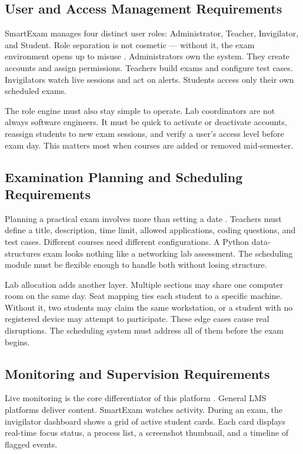 \subsection{User and Access Management Requirements}

SmartExam manages four distinct user roles: Administrator, Teacher, Invigilator, and Student. Role separation is not cosmetic — without it, the exam environment opens up to misuse \cite{rbac1}. Administrators own the system. They create accounts and assign permissions. Teachers build exams and configure test cases. Invigilators watch live sessions and act on alerts. Students access only their own scheduled exams.

The role engine must also stay simple to operate. Lab coordinators are not always software engineers. It must be quick to activate or deactivate accounts, reassign students to new exam sessions, and verify a user's access level before exam day. This matters most when courses are added or removed mid-semester.

\subsection{Examination Planning and Scheduling Requirements}

Planning a practical exam involves more than setting a date \cite{eassess1}. Teachers must define a title, description, time limit, allowed applications, coding questions, and test cases. Different courses need different configurations. A Python data-structures exam looks nothing like a networking lab assessment. The scheduling module must be flexible enough to handle both without losing structure.

Lab allocation adds another layer. Multiple sections may share one computer room on the same day. Seat mapping ties each student to a specific machine. Without it, two students may claim the same workstation, or a student with no registered device may attempt to participate. These edge cases cause real disruptions. The scheduling system must address all of them before the exam begins.

\subsection{Monitoring and Supervision Requirements}

Live monitoring is the core differentiator of this platform \cite{mit_cbt}. General LMS platforms deliver content. SmartExam watches activity. During an exam, the invigilator dashboard shows a grid of active student cards. Each card displays real-time focus status, a process list, a screenshot thumbnail, and a timeline of flagged events.

